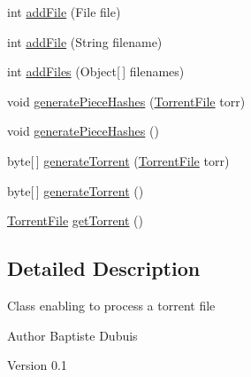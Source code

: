 \begin{DoxyCompactItemize}
\item 
int \hyperlink{classj_bittorrent_a_p_i_1_1_torrent_processor_a87892ae75b24a6316a37093bd3a77123}{addFile} (File file)
\item 
int \hyperlink{classj_bittorrent_a_p_i_1_1_torrent_processor_a6ca859a5a72f7f16c32db57905fdc5df}{addFile} (String filename)
\item 
int \hyperlink{classj_bittorrent_a_p_i_1_1_torrent_processor_af298f29e3f28860a023c85e0b18e2470}{addFiles} (Object\mbox{[}$\,$\mbox{]} filenames)
\item 
void \hyperlink{classj_bittorrent_a_p_i_1_1_torrent_processor_a86fd402a8e9b6a1dbc4c26645dd42d8b}{generatePieceHashes} (\hyperlink{classj_bittorrent_a_p_i_1_1_torrent_file}{TorrentFile} torr)
\item 
void \hyperlink{classj_bittorrent_a_p_i_1_1_torrent_processor_a7c547dbac2b9cf1afd785558c2d7c89b}{generatePieceHashes} ()
\item 
byte\mbox{[}$\,$\mbox{]} \hyperlink{classj_bittorrent_a_p_i_1_1_torrent_processor_aa77ab40de555dd36070fa2d5a332db21}{generateTorrent} (\hyperlink{classj_bittorrent_a_p_i_1_1_torrent_file}{TorrentFile} torr)
\item 
byte\mbox{[}$\,$\mbox{]} \hyperlink{classj_bittorrent_a_p_i_1_1_torrent_processor_a8ac41276f857bafc5e0facbe615a3332}{generateTorrent} ()
\item 
\hyperlink{classj_bittorrent_a_p_i_1_1_torrent_file}{TorrentFile} \hyperlink{classj_bittorrent_a_p_i_1_1_torrent_processor_a2d163f91f70948c6bdd0970e3d124bf2}{getTorrent} ()
\end{DoxyCompactItemize}


\subsection{Detailed Description}
Class enabling to process a torrent file \begin{DoxyAuthor}{Author}
Baptiste Dubuis 
\end{DoxyAuthor}
\begin{DoxyVersion}{Version}
0.1 
\end{DoxyVersion}



